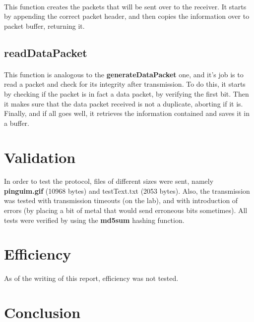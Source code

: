 \documentclass[11pt]{article}
\begin{document}
\paragraph{}This function creates the packets that will be sent over to the receiver. It starts by appending
the correct packet header, and then copies the information over to packet buffer, returning it.

\subsection*{readDataPacket}

\paragraph{}This function is analogous to the \textbf{generateDataPacket} one, and it's job is to read a
packet and check for its integrity after transmission. To do this, it starts by checking if the packet is in
fact a data packet, by verifying the first bit. Then it makes sure that the data packet received is not a
duplicate, aborting if it is. Finally, and if all goes well, it retrieves the information contained and saves
it in a buffer.

\section{Validation}

\paragraph{}In order to test the protocol, files of different sizes were sent, namely \textbf{pinguim.gif}
(10968 bytes) and testText.txt (2053 bytes). Also, the transmission was tested with transmission timeouts
(on the lab), and with introduction of errors (by placing a bit of metal that would send erroneous bits
sometimes). All tests were verified by using the \textbf{md5sum} hashing function.

\section{Efficiency}

\paragraph{}As of the writing of this report, efficiency was not tested.

\section{Conclusion}
\end{document}
